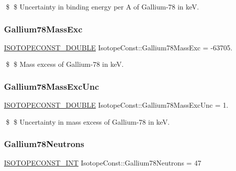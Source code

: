 \$ \$ Uncertainty in binding energy per A of Gallium-\/78 in keV. \mbox{\label{group___isotope_const-_gallium-_ga78_gae1d5533992513a2825c9c80b7a34bc55}} 
\subsubsection{\texorpdfstring{Gallium78\+Mass\+Exc}{Gallium78MassExc}}
{\footnotesize\ttfamily \mbox{\hyperlink{group___isotope_const-_macros_ga8f45a7272ce02c0b4c65c44636ed719a}{I\+S\+O\+T\+O\+P\+E\+C\+O\+N\+S\+T\+\_\+\+D\+O\+U\+B\+LE}} Isotope\+Const\+::\+Gallium78\+Mass\+Exc = -\/63705.}

\$ \$ Mass excess of Gallium-\/78 in keV. \mbox{\label{group___isotope_const-_gallium-_ga78_ga618fa5880c2568991bea8f2a16b03e21}} 
\subsubsection{\texorpdfstring{Gallium78\+Mass\+Exc\+Unc}{Gallium78MassExcUnc}}
{\footnotesize\ttfamily \mbox{\hyperlink{group___isotope_const-_macros_ga8f45a7272ce02c0b4c65c44636ed719a}{I\+S\+O\+T\+O\+P\+E\+C\+O\+N\+S\+T\+\_\+\+D\+O\+U\+B\+LE}} Isotope\+Const\+::\+Gallium78\+Mass\+Exc\+Unc = 1.}

\$ \$ Uncertainty in mass excess of Gallium-\/78 in keV. \mbox{\label{group___isotope_const-_gallium-_ga78_gadcd7eb5a26babdfa0c3ebdfb4a52911d}} 
\subsubsection{\texorpdfstring{Gallium78\+Neutrons}{Gallium78Neutrons}}
{\footnotesize\ttfamily \mbox{\hyperlink{group___isotope_const-_macros_ga5f18360b3e99483a35c32d789e62621c}{I\+S\+O\+T\+O\+P\+E\+C\+O\+N\+S\+T\+\_\+\+I\+NT}} Isotope\+Const\+::\+Gallium78\+Neutrons = 47}

